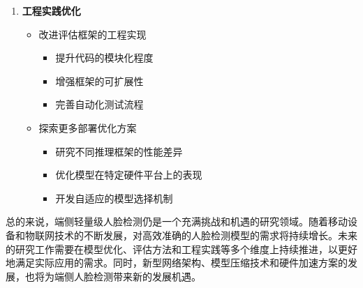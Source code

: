 \documentclass{article}
\begin{document}
\begin{enumerate}
    \item \textbf{工程实践优化}
    \begin{itemize}
        \item 改进评估框架的工程实现
        \begin{itemize}
            \item 提升代码的模块化程度
            \item 增强框架的可扩展性
            \item 完善自动化测试流程
        \end{itemize}
        \item 探索更多部署优化方案
        \begin{itemize}
            \item 研究不同推理框架的性能差异
            \item 优化模型在特定硬件平台上的表现
            \item 开发自适应的模型选择机制
        \end{itemize}
    \end{itemize}
\end{enumerate}

总的来说，端侧轻量级人脸检测仍是一个充满挑战和机遇的研究领域。随着移动设备和物联网技术的不断发展，对高效准确的人脸检测模型的需求将持续增长。未来的研究工作需要在模型优化、评估方法和工程实践等多个维度上持续推进，以更好地满足实际应用的需求。同时，新型网络架构、模型压缩技术和硬件加速方案的发展，也将为端侧人脸检测带来新的发展机遇。

\clearpage




\clearpage
\end{document}
